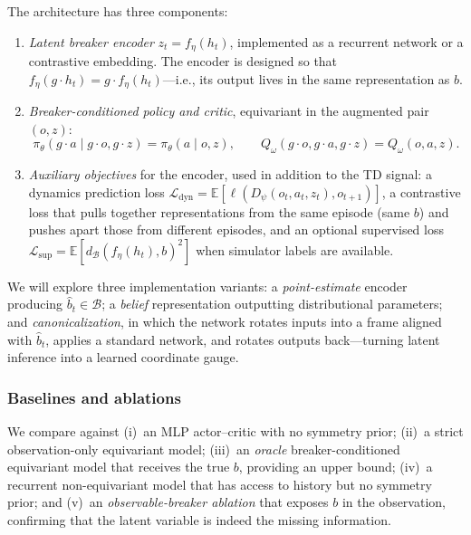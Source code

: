\documentclass[11pt]{article}
\begin{document}
The architecture has three components:
\begin{enumerate}[noitemsep,topsep=2pt]
  \item \textit{Latent breaker encoder} $z_t = f_\eta(h_t)$, implemented as a recurrent
    network or a contrastive embedding. The encoder is designed so that
    $f_\eta(g \cdot h_t) = g \cdot f_\eta(h_t)$---i.e., its output lives in
    the same representation as $b$.

  \item \textit{Breaker-conditioned policy and critic}, equivariant in the augmented
    pair $(o, z)$:
    \[
      \pi_\theta(g\!\cdot\!a \mid g\!\cdot\!o, g\!\cdot\!z) = \pi_\theta(a \mid o, z),
      \qquad
      Q_\omega(g\!\cdot\!o, g\!\cdot\!a, g\!\cdot\!z) = Q_\omega(o,a,z).
    \]

  \item \textit{Auxiliary objectives} for the encoder, used in addition to the TD signal:
    a dynamics prediction loss
    $\mathcal{L}_{\text{dyn}} = \mathbb{E}[\ell(D_\psi(o_t, a_t, z_t), o_{t+1})]$,
    a contrastive loss that pulls together representations from the same
    episode (same $b$) and pushes apart those from different episodes, and an
    optional supervised loss
    $\mathcal{L}_{\text{sup}} = \mathbb{E}[d_\mathcal{B}(f_\eta(h_t), b)^2]$
    when simulator labels are available.
\end{enumerate}

We will explore three implementation variants: a \textit{point-estimate} encoder
producing $\widehat{b}_t \in \mathcal{B}$; a \textit{belief} representation
outputting distributional parameters; and \textit{canonicalization}, in which the
network rotates inputs into a frame aligned with $\widehat{b}_t$, applies a
standard network, and rotates outputs back---turning latent inference into a
learned coordinate gauge.

\subsubsection*{Baselines and ablations}

We compare against (i)~an MLP actor--critic with no symmetry prior; (ii)~a
strict observation-only equivariant model; (iii)~an \textit{oracle}
breaker-conditioned equivariant model that receives the true $b$, providing an
upper bound; (iv)~a recurrent non-equivariant model that has access to history
but no symmetry prior; and (v)~an \textit{observable-breaker ablation} that
exposes $b$ in the observation, confirming that the latent variable is indeed
the missing information.
\end{document}
